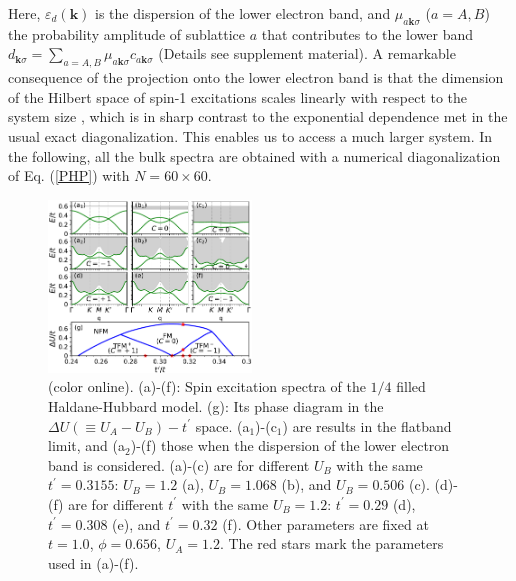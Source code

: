 \documentclass[amsmath,superscriptaddress,showpacs,aps,prl,twocolumn]{revtex4-1}
\begin{document}
Here, $\varepsilon_d(\mathbf{k})$ is the dispersion of the lower electron band, and $\mu_{a\mathbf{k}\sigma}$ ($a=A,B$) the probability amplitude of sublattice $a$ that contributes to the lower band $d_{\mathbf{k}\sigma}=\sum_{a=A,B}\mu_{a\mathbf{k}\sigma}c_{a\mathbf{k}\sigma}$ (Details see supplement material). A remarkable consequence of the projection onto the lower electron band is that the dimension of the Hilbert space of spin-1 excitations scales linearly with respect to the system size \cite{Su_PRB2018,Su_PRB2019}, which is in sharp contrast to the exponential dependence met in the usual exact diagonalization. This enables us to access a much larger system. In the following, all the bulk spectra are obtained with a numerical diagonalization of Eq. (\ref{PHP}) with $N=60\times60$.

\begin{figure}
\centering
\includegraphics[width=0.48\textwidth]{bulkresult}
\caption{(color online). (a)-(f): Spin excitation spectra of the $1/4$ filled Haldane-Hubbard model. (g): Its phase diagram in the $\Delta U(\equiv U_A-U_B)-t^\prime$ space. (a$_1$)-(c$_1$) are results in the flatband limit, and (a$_2$)-(f) those when the dispersion of the lower electron band is considered.
(a)-(c) are for different $U_B$ with the same $t^\prime=0.3155$: $U_B=1.2$ (a), $U_B=1.068$ (b), and $U_B=0.506$ (c). (d)-(f) are for different $t^\prime$ with the same $U_B=1.2$: $t^\prime=0.29$ (d), $t^\prime=0.308$ (e), and  $t^\prime=0.32$ (f). Other parameters are fixed at $t=1.0$, $\phi=0.656$, $U_A=1.2$. The red stars mark the parameters used in (a)-(f).}
\label{bulkresult}
\end{figure}
\end{document}
